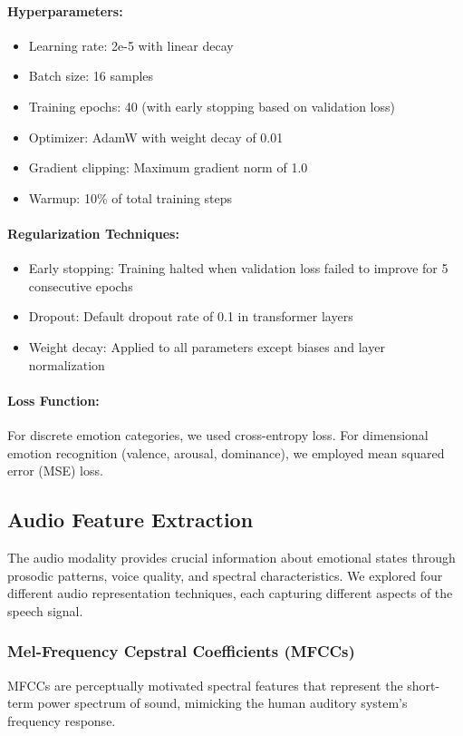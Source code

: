 \documentclass[12pt]{article}
\begin{document}
\paragraph{Hyperparameters:}
\begin{itemize}
    \item Learning rate: 2e-5 with linear decay
    \item Batch size: 16 samples
    \item Training epochs: 40 (with early stopping based on validation loss)
    \item Optimizer: AdamW with weight decay of 0.01
    \item Gradient clipping: Maximum gradient norm of 1.0
    \item Warmup: 10\% of total training steps
\end{itemize}

\paragraph{Regularization Techniques:}
\begin{itemize}
    \item Early stopping: Training halted when validation loss failed to improve for 5 consecutive epochs
    \item Dropout: Default dropout rate of 0.1 in transformer layers
    \item Weight decay: Applied to all parameters except biases and layer normalization
\end{itemize}

\paragraph{Loss Function:}
For discrete emotion categories, we used cross-entropy loss. For dimensional emotion recognition (valence, arousal, dominance), we employed mean squared error (MSE) loss.

\subsection{Audio Feature Extraction}
The audio modality provides crucial information about emotional states through prosodic patterns, voice quality, and spectral characteristics. We explored four different audio representation techniques, each capturing different aspects of the speech signal.

\subsubsection{Mel-Frequency Cepstral Coefficients (MFCCs)}
MFCCs are perceptually motivated spectral features that represent the short-term power spectrum of sound, mimicking the human auditory system's frequency response.
\end{document}
